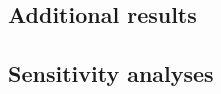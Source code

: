 \documentclass[12pt]{article}
\begin{document}
\begin{appendix}
    \subsection{Additional results}
    
    \subsection{Sensitivity analyses}

\end{appendix}

\end{document}
